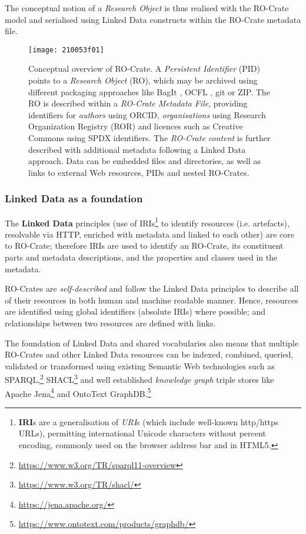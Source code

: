 \documentclass[ds,v1.1.2,openaccess]{iosart2x}%
\begin{document}
The conceptual notion of a \textit{Research Object}
\cite{doi:10.1016/j.future.2011.08.004} is thus realised with the RO-Crate
model and serialised using Linked Data constructs within the RO-Crate
metadata file.

\begin{figure}%
\texttt{[image: 210053f01]}
\caption{Conceptual overview of RO-Crate. A \emph{Persistent
Identifier} (PID) \cite{doi:10.1371/journal.pbio.2001414} points to a
\emph{Research Object} (RO), which may be archived using different
packaging approaches like BagIt \cite{doi:10.17487/rfc8493}, OCFL \cite
{ocfl_2020}, git or ZIP. The RO is described within a \emph{RO-Crate
Metadata File}, providing identifiers for \emph{authors} using ORCID,
\emph{organisations} using Research Organization Registry (ROR) \cite
{doi:10.6087/kcse.192} and licences such as Creative Commons using SPDX
identifiers. The \emph{RO-Crate content} is further described with
additional metadata following a Linked Data approach. Data can be
embedded files and directories, as well as links to external Web
resources, PIDs and nested RO-Crates.}
\label{fig:conceptual}
\end{figure}

\subsubsection{Linked Data as a foundation}%

\label{sec:linkeddata}

The \textbf{Linked Data} principles \cite{doi:10.4018/978-1-60960-593-3.ch008}
(use of IRIs\footnote{\textbf{IRI}s \cite{doi:10.17487/rfc3987} are a generalisation
 of \textit{URI}s
(which include well-known http/https URLs), permitting international
Unicode characters without percent encoding, commonly used on the
browser address bar and in HTML5.} to identify resources (i.e. artefacts), resolvable via
HTTP, enriched with metadata and linked to each other) are core to
RO-Crate; therefore IRIs are used to identify an RO-Crate, its
constituent parts and metadata descriptions, and the properties and
classes used in the metadata.

RO-Crates are \textit{self-described} and follow the Linked Data principles to
describe all of their resources in both human and machine readable
manner. Hence, resources are identified using global identifiers
(absolute IRIs) where possible; and relationships between two resources
are defined with links.

The foundation of Linked Data and shared vocabularies also means that
multiple RO-Crates and other Linked Data resources can be indexed,
combined, queried, validated or transformed using existing Semantic Web
technologies such as SPARQL,\footnote{\url{https://www.w3.org/TR/sparql11-overview}}
SHACL\footnote{\url{https://www.w3.org/TR/shacl/}} and well established \textit{knowledge
graph} triple stores like Apache Jena\footnote{\url{https://jena.apache.org/}} and
OntoText GraphDB.\footnote{\url{https://www.ontotext.com/products/graphdb/}}
\end{document}
